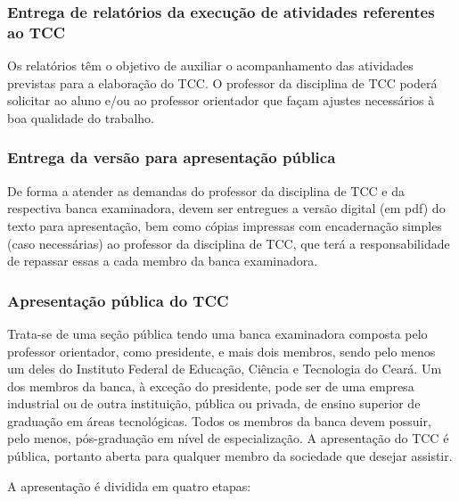 \subsubsection{Entrega de relatórios da execução de atividades referentes ao TCC}

Os relatórios têm o objetivo de auxiliar o acompanhamento das atividades previstas para a elaboração do TCC. O
professor da disciplina de TCC poderá solicitar ao aluno e/ou ao professor orientador que façam ajustes necessários à
boa qualidade do trabalho.

\subsubsection{Entrega da versão para apresentação pública}

De forma a atender as demandas do professor da disciplina de TCC e da respectiva banca examinadora, devem ser entregues a versão digital (em pdf) do texto para apresentação, bem como cópias impressas com encadernação simples (caso necessárias) ao professor da disciplina de TCC, que terá a responsabilidade de repassar essas a cada membro da banca examinadora.

\subsubsection{Apresentação pública do TCC}

Trata-se de uma seção pública tendo uma banca examinadora composta pelo professor orientador, como presidente, e mais dois membros, sendo pelo menos um deles do Instituto Federal de Educação, Ciência e Tecnologia do Ceará. Um dos membros da banca, à exceção do presidente, pode ser de uma empresa industrial ou de outra instituição, pública ou privada, de ensino superior de graduação em áreas tecnológicas.  Todos os membros da banca devem possuir, pelo menos, pós-graduação em nível de especialização.  A apresentação do TCC é pública, portanto aberta para qualquer membro da sociedade que desejar assistir.

A apresentação é dividida em quatro etapas:

